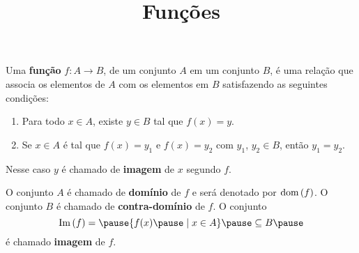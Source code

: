 \documentclass{beamer}
\title{Funções}
\author[\autor]{\autor}
\institute[\instituto]{\instituto}
\date{}
\begin{document}
    \begin{frame}
        \maketitle
    \end{frame}


    \begin{frame}
        \begin{definicao}
            Uma \textbf{função} \pause $f : A \to B$, \pause de um conjunto $A$ \pause em um conjunto $B$,
            \pause é uma relação que associa os elementos de $A$ \pause com os elementos em $B$ \pause
            satisfazendo as seguintes condições:\pause
            \begin{enumerate}[label={\roman*})]
                \item Para todo $x \in A$, \pause existe $y \in B$ \pause tal que $f(x) = y$.\pause

                \vspace{.3cm}

                \item  Se $x \in A$ \pause é tal que $f(x) = y_1$ \pause e $f(x) = y_2$ \pause com $y_1$, \pause $y_2 \in B$, \pause então $y_1 = y_2$.\pause
            \end{enumerate}
            Nesse caso $y$ é chamado de \textbf{imagem} \pause de $x$ segundo $f$.\pause
        \end{definicao}

        O conjunto $A$ é chamado de \textbf{domínio} \pause de $f$ \pause e será denotado por ${\rm dom\,}(f)$. \pause O conjunto $B$ é chamado de \textbf{contra-domínio} \pause de $f$. \pause O conjunto\pause
        \[
            \im(f) = \pause \{f(x) \pause \mid x \in A\} \pause \sub B\pause
        \]
        é chamado \textbf{imagem} de $f$.
    \end{frame}
\end{document}
